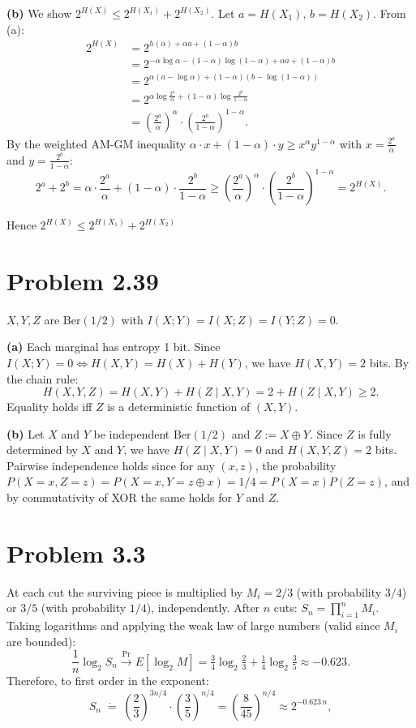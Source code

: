 \documentclass[11pt,a4paper]{article}
\begin{document}
\textbf{(b)} We show $2^{H(X)}\le 2^{H(X_1)}+2^{H(X_2)}$. Let $a=H(X_1)$, $b=H(X_2)$. From (a):
\begin{align*}
2^{H(X)} &= 2^{h(\alpha)+\alpha a+(1-\alpha)b}\\
&= 2^{-\alpha\log\alpha-(1-\alpha)\log(1-\alpha)+\alpha a+(1-\alpha)b}\\
&= 2^{\alpha(a-\log\alpha)+(1-\alpha)(b-\log(1-\alpha))}\\
&= 2^{\alpha\log\frac{2^a}{\alpha}+(1-\alpha)\log\frac{2^b}{1-\alpha}}\\
&= \left(\frac{2^a}{\alpha}\right)^{\!\alpha}\cdot\left(\frac{2^b}{1-\alpha}\right)^{\!1-\alpha}.
\end{align*}
By the weighted AM-GM inequality $\alpha\cdot x+(1-\alpha)\cdot y\ge x^\alpha y^{1-\alpha}$ with $x=\frac{2^a}{\alpha}$ and $y=\frac{2^b}{1-\alpha}$:
\[
2^a+2^b = \alpha\cdot\frac{2^a}{\alpha}+(1-\alpha)\cdot\frac{2^b}{1-\alpha} \ge \left(\frac{2^a}{\alpha}\right)^{\!\alpha}\cdot\left(\frac{2^b}{1-\alpha}\right)^{\!1-\alpha} = 2^{H(X)}.
\]

Hence $2^{H(X)}\le 2^{H(X_1)}+2^{H(X_2)}$
\section*{Problem 2.39 }

$X,Y,Z$ are $\mathrm{Ber}(1/2)$ with $I(X;Y)=I(X;Z)=I(Y;Z)=0$.

\textbf{(a)} Each marginal has entropy 1 bit. Since $I(X;Y)=0\Leftrightarrow H(X,Y)=H(X)+H(Y)$, we have $H(X,Y)=2$ bits. By the chain rule:
\[
  H(X,Y,Z)=H(X,Y)+H(Z\mid X,Y)=2+H(Z\mid X,Y)\ge 2.
\]
Equality holds iff $Z$ is a deterministic function of $(X,Y)$. \newline

\textbf{(b)} Let $X$ and $Y$ be independent $\mathrm{Ber}(1/2)$ and $Z:=X\oplus Y$. Since $Z$ is fully determined by $X$ and $Y$, we have $H(Z\mid X,Y)=0$ and $H(X,Y,Z)=2$ bits. Pairwise independence holds since for any $(x,z)$, the probability $P(X=x, Z=z) = P(X=x, Y=z\oplus x) = 1/4 = P(X=x)P(Z=z)$, and by commutativity of XOR the same holds for $Y$ and $Z$.

\section*{Problem 3.3}

At each cut the surviving piece is multiplied by $M_i=2/3$ (with probability $3/4$) or $3/5$ (with probability $1/4$), independently. After $n$ cuts: $S_n=\prod_{i=1}^n M_i$. Taking logarithms and applying the weak law of large numbers (valid since $M_i$ are bounded):
\[
  \frac{1}{n}\log_2 S_n\xrightarrow{\Pr}E[\log_2 M]
  =\tfrac{3}{4}\log_2\tfrac{2}{3}+\tfrac{1}{4}\log_2\tfrac{3}{5}
  \approx -0.623.
\]
Therefore, to first order in the exponent:
\[
  S_n\;\dot{=}\;\left(\frac{2}{3}\right)^{\!3n/4}\!\cdot\left(\frac{3}{5}\right)^{\!n/4}
  =\left(\frac{8}{45}\right)^{\!n/4}\approx 2^{-0.623\,n},
\]

\end{document}
